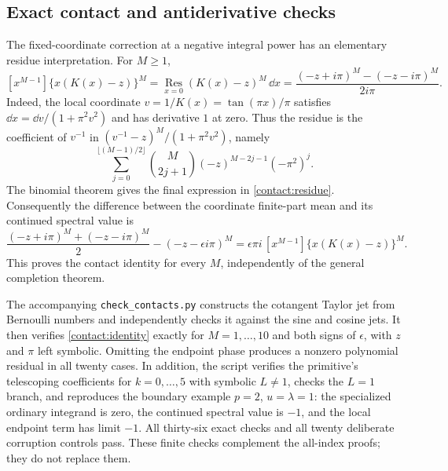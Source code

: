 \subsection{Exact contact and antiderivative checks}
\label{contact:verification}

The fixed-coordinate correction at a negative integral power has an
elementary residue interpretation.  For $M\ge1$,
\begin{equation}\label{contact:residue}
 [x^{M-1}]\{x(K(x)-z)\}^M
 =\operatorname*{Res}_{x=0}(K(x)-z)^M\,\dd x
 =\frac{(-z+i\pi)^M-(-z-i\pi)^M}{2i\pi}.
\end{equation}
Indeed, the local coordinate $v=1/K(x)=\tan(\pi x)/\pi$ satisfies
$\dd x=\dd v/(1+\pi^2v^2)$ and has derivative $1$ at zero.  Thus
the residue is the coefficient of $v^{-1}$ in
$(v^{-1}-z)^M/(1+\pi^2v^2)$, namely
\[
 \sum_{j=0}^{\lfloor(M-1)/2\rfloor}
   \binom{M}{2j+1}(-z)^{M-2j-1}(-\pi^2)^j.
\]
The binomial theorem gives the final expression in
\eqref{contact:residue}.  Consequently the difference between the
coordinate finite-part mean and its continued spectral value is
\begin{equation}\label{contact:identity}
 \frac{(-z+i\pi)^M+(-z-i\pi)^M}{2}
       -(-z-\epsilon i\pi)^M
 =\epsilon\pi i\,[x^{M-1}]\{x(K(x)-z)\}^M.
\end{equation}
This proves the contact identity for every $M$, independently of the
general completion theorem.

The accompanying \texttt{check\_contacts.py} constructs the cotangent
Taylor jet from Bernoulli numbers and independently checks it against
the sine and cosine jets.  It then verifies \eqref{contact:identity}
exactly for $M=1,\ldots,10$ and both signs of $\epsilon$, with $z$
and $\pi$ left symbolic.  Omitting the endpoint phase produces a
nonzero polynomial residual in all twenty cases.  In addition, the
script verifies the primitive's telescoping coefficients for
$k=0,\ldots,5$ with symbolic $L\ne1$, checks the $L=1$ branch, and
reproduces the boundary example $p=2$, $u=\lambda=1$: the specialized
ordinary integrand is zero, the continued spectral value is $-1$,
and the local endpoint term has limit $-1$.  All thirty-six exact
checks and all twenty deliberate corruption controls pass.  These
finite checks complement the all-index proofs; they do not replace
them.
